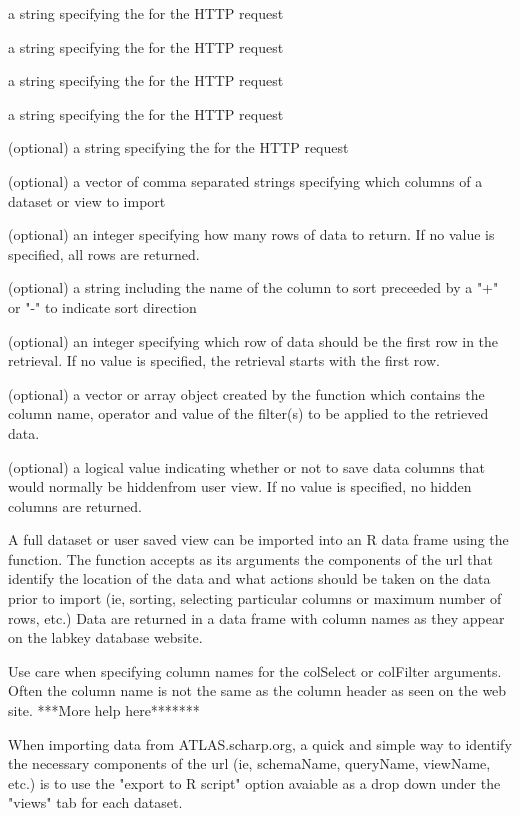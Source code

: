 \documentclass{article}
\begin{document}
\begin{Arguments}
\begin{ldescription}
\item[\code{baseUrl}] a string specifying the for the HTTP request
\item[\code{folderPath}] a string specifying the  for the HTTP request
\item[\code{schemaName}] a string specifying the   for the HTTP request
\item[\code{queryName}] a string specifying the  for the HTTP request
\item[\code{viewName}] (optional) a string specifying the  for the HTTP request
\item[\code{colSelect}] (optional) a vector of comma separated strings specifying which columns of a dataset or view to import
\item[\code{maxRows}] (optional) an integer specifying how many rows of data to return. If no value is specified, all rows are returned.
\item[\code{colSort}] (optional) a string including the name of the column to sort preceeded by a "+" or "-" to indicate sort direction
\item[\code{rowOffset}] (optional) an integer specifying which row of data should be the first row in the retrieval. If no
value is specified, the retrieval starts with the first row.
\item[\code{colFilter}] (optional) a vector or array object created by the  function which contains the
column name, operator and value of the filter(s) to be applied to the retrieved data.
\item[\code{stripAllHidden}] (optional) a logical value indicating whether or not to save data columns that would normally be hiddenfrom user view. If no value is specified, no hidden columns are returned.
\end{ldescription}
\end{Arguments}
\begin{Details}\relax
A full dataset or user saved view can be imported into an R data frame using the  
function. The function accepts as its arguments the components of the url that identify
the location of the data and what actions should be taken on the data prior to import
(ie, sorting, selecting particular columns or maximum number of rows, etc.) Data are returned in a data 
frame with column names as they appear on the labkey database website. 

Use care when specifying column names for the colSelect or colFilter arguments. Often the column name
is not the same as the column header as seen on the web site. ***More help here*******

When importing data from ATLAS.scharp.org, a quick and simple way to identify the necessary components of the url 
(ie, schemaName, queryName, viewName, etc.) is to use the "export to R script" option avaiable as a drop down
under the "views" tab for each dataset.
\end{Details}
\end{document}
